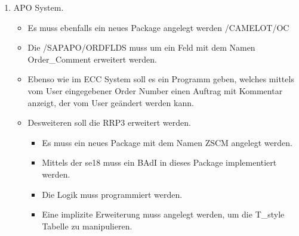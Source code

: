 \begin{enumerate}[itemsep=0em,partopsep=0em,parsep=0em,topsep=0em]
\begin{enumerate}
	\item APO System. 
		\begin{itemize}
		\item Es muss ebenfalls ein neues Package angelegt werden /CAMELOT/OC
		\item Die /SAPAPO/ORDFLDS muss um ein Feld mit dem Namen Order\_Comment erweitert werden.
		\item Ebenso wie im ECC System soll es ein Programm geben, welches mittels vom User eingegebener Order Number einen Auftrag mit Kommentar anzeigt, der vom User geändert werden kann.
		\item Desweiteren soll die RRP3 erweitert werden.
		\begin{itemize}
			\item Es muss ein neues Package mit dem Namen ZSCM angelegt werden.
			\item Mittels der se18 muss ein BAdI in dieses Package implementiert werden.
			\item Die Logik muss programmiert werden.
			\item Eine implizite Erweiterung muss angelegt werden, um die T\_style Tabelle zu manipulieren.
		\end{itemize}
		\end{itemize}
	\end{enumerate}
\end{enumerate}
